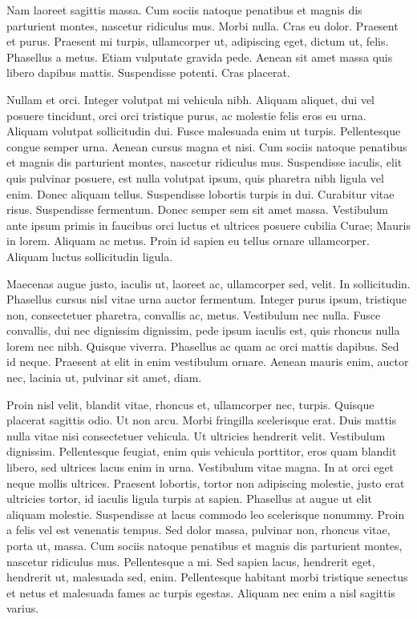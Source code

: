 \documentclass[printmode,mgr,pl]{mgr}
\begin{document}
Nam laoreet sagittis massa. Cum sociis natoque penatibus et magnis dis
parturient montes, nascetur ridiculus mus. Morbi nulla. Cras eu
dolor. Praesent et purus. Praesent mi turpis, ullamcorper ut,
adipiscing eget, dictum ut, felis. Phasellus a metus. Etiam vulputate
gravida pede. Aenean sit amet massa quis libero dapibus
mattis. Suspendisse potenti. Cras placerat.

Nullam et orci. Integer volutpat mi vehicula nibh. Aliquam aliquet,
dui vel posuere tincidunt, orci orci tristique purus, ac molestie
felis eros eu urna. Aliquam volutpat sollicitudin dui. Fusce malesuada
enim ut turpis. Pellentesque congue semper urna. Aenean cursus magna
et nisi. Cum sociis natoque penatibus et magnis dis parturient montes,
nascetur ridiculus mus. Suspendisse iaculis, elit quis pulvinar
posuere, est nulla volutpat ipsum, quis pharetra nibh ligula vel
enim. Donec aliquam tellus. Suspendisse lobortis turpis in
dui. Curabitur vitae risus. Suspendisse fermentum. Donec semper sem
sit amet massa. Vestibulum ante ipsum primis in faucibus orci luctus
et ultrices posuere cubilia Curae; Mauris in lorem. Aliquam ac
metus. Proin id sapien eu tellus ornare ullamcorper. Aliquam luctus
sollicitudin ligula.

Maecenas augue justo, iaculis ut, laoreet ac, ullamcorper sed,
velit. In sollicitudin. Phasellus cursus nisl vitae urna auctor
fermentum. Integer purus ipsum, tristique non, consectetuer pharetra,
convallis ac, metus. Vestibulum nec nulla. Fusce convallis, dui nec
dignissim dignissim, pede ipsum iaculis est, quis rhoncus nulla lorem
nec nibh. Quisque viverra. Phasellus ac quam ac orci mattis
dapibus. Sed id neque. Praesent at elit in enim vestibulum
ornare. Aenean mauris enim, auctor nec, lacinia ut, pulvinar sit amet,
diam.

Proin nisl velit, blandit vitae, rhoncus et, ullamcorper nec,
turpis. Quisque placerat sagittis odio. Ut non arcu. Morbi fringilla
scelerisque erat. Duis mattis nulla vitae nisi consectetuer
vehicula. Ut ultricies hendrerit velit. Vestibulum
dignissim. Pellentesque feugiat, enim quis vehicula porttitor, eros
quam blandit libero, sed ultrices lacus enim in urna. Vestibulum vitae
magna. In at orci eget neque mollis ultrices. Praesent lobortis,
tortor non adipiscing molestie, justo erat ultricies tortor, id
iaculis ligula turpis at sapien. Phasellus at augue ut elit aliquam
molestie. Suspendisse at lacus commodo leo scelerisque nonummy. Proin
a felis vel est venenatis tempus. Sed dolor massa, pulvinar non,
rhoncus vitae, porta ut, massa. Cum sociis natoque penatibus et magnis
dis parturient montes, nascetur ridiculus mus. Pellentesque a mi. Sed
sapien lacus, hendrerit eget, hendrerit ut, malesuada sed,
enim. Pellentesque habitant morbi tristique senectus et netus et
malesuada fames ac turpis egestas. Aliquam nec enim a nisl sagittis
varius.
\end{document}
